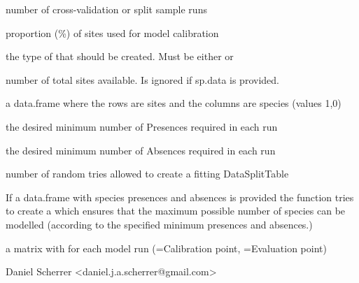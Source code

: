 \documentclass[a4paper]{book}
\begin{document}
%
\begin{Arguments}
\begin{ldescription}
\item[\code{NbRunEval}] number of cross-validation or split sample runs
\item[\code{DataSplit}] proportion (\%) of sites used for model calibration
\item[\code{validation.method}] the type of  that should be created. Must be either  or 
\item[\code{NbSites}] number of total sites available. Is ignored if sp.data is provided.
\item[\code{sp.data}] a data.frame where the rows are sites and the columns are species (values 1,0)
\item[\code{minNbPresences}] the desired minimum number of Presences required in each run
\item[\code{minNbAbsences}] the desired minimum number of Absences required in each run
\item[\code{maxNbTry}] number of random tries allowed to create a fitting DataSplitTable
\end{ldescription}
\end{Arguments}
%
\begin{Details}\relax
If a  data.frame with species presences and absences is provided the function tries to create a  which ensures that the maximum possible number of species can be modelled (according to the specified minimum presences and absences.)
\end{Details}
%
\begin{Value}
\begin{ldescription}
\item[\code{DataSplitTable}] a matrix with  for each model run (=Calibration point, =Evaluation point)
\end{ldescription}





\end{Value}
%
\begin{Author}\relax
Daniel Scherrer <daniel.j.a.scherrer@gmail.com>

\end{Author}
%
\begin{SeeAlso}\relax
{}

\end{SeeAlso}
\end{document}

